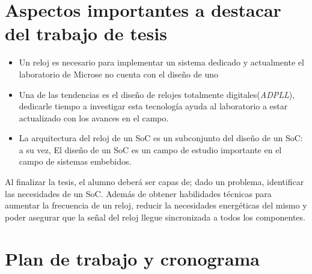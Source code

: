 \documentclass[runningheads,a4paper]{llncs}
\begin{document}
\section{Aspectos importantes a destacar del trabajo de tesis}
\begin{itemize}
\settowidth{\leftmargin}{{\Large$\circ$}}\advance\leftmargin{}
\itemsep8pt\relax
\renewcommand\labelitemi{{\lower1.5pt\hbox{\Large$\circ$}}}

     \item Un reloj es necesario para implementar un sistema dedicado y actualmente el laboratorio de Microse no cuenta con el diseño de uno

     \item Una de las tendencias es el diseño de relojes totalmente digitales(\textit{ADPLL}), dedicarle tiempo a investigar esta tecnología ayuda al laboratorio a estar actualizado con los avances en el campo.

     \item La arquitectura del reloj de un SoC es un subconjunto del diseño de un SoC: a su vez, El diseño de un SoC es un campo de estudio importante en el campo de sistemas embebidos.

 \end{itemize}
Al finalizar la tesis, el alumno deberá ser capas de; dado un problema, identificar las necesidades de un SoC. Además de obtener habilidades técnicas para aumentar la frecuencia de un reloj, reducir la necesidades energéticas del mismo y poder asegurar que la señal del reloj llegue sincronizada a todos los componentes. 

\section{Plan de trabajo y cronograma}
\end{document}
